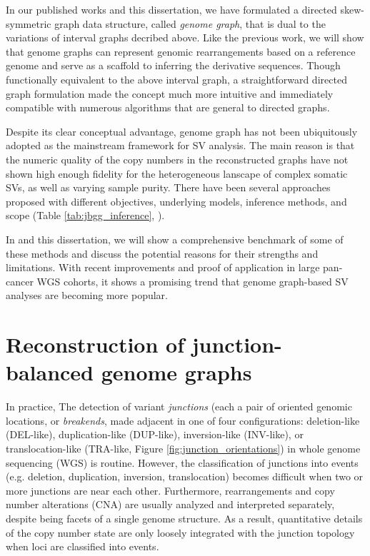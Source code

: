 \documentclass[phd,tocprelim]{cornell}
\begin{document}
In our published works and this dissertation, we have formulated a directed skew-symmetric graph data structure, called \textit{genome graph}, that is dual to the variations of interval graphs decribed above. Like the previous work, we will show that genome graphs can represent genomic rearrangements based on a reference genome and serve as a scaffold to inferring the derivative sequences. Though functionally equivalent to the above interval graph, a straightforward directed graph formulation made the concept much more intuitive and immediately compatible with numerous algorithms that are general to directed graphs.

Despite its clear conceptual advantage, genome graph has not been ubiquitously adopted as the mainstream framework for SV analysis. The main reason is that the numeric quality of the copy numbers in the reconstructed graphs have not shown high enough fidelity for the heterogeneous lanscape of complex somatic SVs, as well as varying sample purity. There have been several approaches proposed with different objectives, underlying models, inference methods, and scope (Table \ref{tab:jbgg_inference}, \cite{Oesper2012-vw,McPherson2017-ry,Li2016-qa,Dzamba2017-wo,Deshpande2019-gs,Li2020-ds,Lee2021-rl,Aganezov2019-yh}).

In \cite{Hadi2020-um} and this dissertation, we will show a comprehensive benchmark of some of these methods and discuss the potential reasons for their strengths and limitations. With recent improvements and proof of application in large pan-cancer WGS cohorts, it shows a promising trend that genome graph-based SV analyses are becoming more popular.


\section{Reconstruction of junction-balanced genome graphs}
In practice, The detection of variant \textit{junctions} (each a pair of oriented genomic locations, or \textit{breakends}, made adjacent in one of four configurations: deletion-like (DEL-like), duplication-like (DUP-like), inversion-like (INV-like), or translocation-like (TRA-like, Figure \ref{fig:junction_orientations}) in whole genome sequencing (WGS) is routine. However, the classification of junctions into events (e.g. deletion, duplication, inversion, translocation) becomes difficult when two or more junctions are near each other.  Furthermore, rearrangements and copy number alterations (CNA) are usually analyzed and interpreted separately, despite being facets of a single genome structure. As a result, quantitative details of the copy number state are only loosely integrated with the junction topology when loci are classified into events. 
\end{document}
